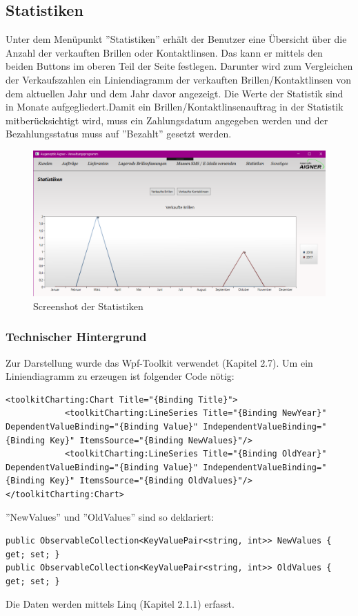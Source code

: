 \subsection{Statistiken}
Unter dem Menüpunkt ''Statistiken'' erhält der Benutzer eine Übersicht über die Anzahl der verkauften Brillen oder Kontaktlinsen. Das kann er mittels den beiden Buttons im oberen Teil der Seite festlegen. Darunter wird zum Vergleichen der Verkaufszahlen ein Liniendiagramm der verkauften Brillen/Kontaktlinsen von dem aktuellen Jahr und dem Jahr davor angezeigt. Die Werte der Statistik sind in Monate aufgegliedert.\newline Damit ein Brillen/Kontaktlinsenauftrag in der Statistik mitberücksichtigt wird, muss ein Zahlungsdatum angegeben werden und der Bezahlungsstatus muss auf ''Bezahlt'' gesetzt werden.
\begin{figure}[H]
\begin{center}
	\includegraphics[scale=.45]{images/Statistiken.png}
\end{center}
	\caption{Screenshot der Statistiken}
	\label{fig:sample}
\end{figure}
\subsubsection{Technischer Hintergrund}
Zur Darstellung wurde das Wpf-Toolkit verwendet (Kapitel 2.7). \newline
Um ein Liniendiagramm zu erzeugen ist folgender Code nötig:
\begin{lstlisting}
<toolkitCharting:Chart Title="{Binding Title}">
            <toolkitCharting:LineSeries Title="{Binding NewYear}"  DependentValueBinding="{Binding Value}" IndependentValueBinding="{Binding Key}" ItemsSource="{Binding NewValues}"/>
            <toolkitCharting:LineSeries Title="{Binding OldYear}"  DependentValueBinding="{Binding Value}" IndependentValueBinding="{Binding Key}" ItemsSource="{Binding OldValues}"/>
</toolkitCharting:Chart>
\end{lstlisting}
''NewValues'' und ''OldValues'' sind so deklariert: 
\begin{lstlisting}
public ObservableCollection<KeyValuePair<string, int>> NewValues { get; set; }
public ObservableCollection<KeyValuePair<string, int>> OldValues { get; set; }
\end{lstlisting}
Die Daten werden mittels Linq (Kapitel 2.1.1) erfasst.
